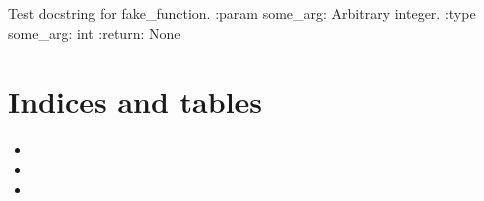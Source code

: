 \documentclass[letterpaper,10pt,english]{sphinxmanual}
\begin{document}
\begin{fulllineitems}
\label{\detokenize{usage:src.main.sphinx_test.fake_function}}
\pysigstartsignatures
{}
\pysigstopsignatures
\sphinxAtStartPar
Test docstring for fake\_function.
:param some\_arg: Arbitrary integer.
:type some\_arg: int
:return: None

\end{fulllineitems}



\chapter{Indices and tables}
\label{\detokenize{index:indices-and-tables}}\begin{itemize}
\item {} 
\sphinxAtStartPar
{}

\item {} 
\sphinxAtStartPar
{}

\item {} 
\sphinxAtStartPar
{}

\end{itemize}



\renewcommand{\indexname}{Index}
\printindex
\end{document}
